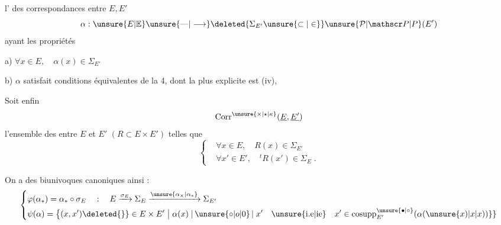 l' des  correspondances entre $E,E'$
\[
 \alpha:\unsure{E|{\mathbb E}}\unsure{\mbox{---}|\longrightarrow}
 \deleted{\Sigma_{E'}\unsure{\subset|\in}}\unsure{\mathcal P|\mathscr P|P}(E')
\]
ayant les propriétés

a) $\forall x\in E,\quad\alpha(x)\in\Sigma_{E'}$

b) $\alpha$ satisfait  conditions équivalentes de la  4, dont la plus explicite est  (iv), 

Soit enfin
\[
 \operatorname{Corr}^{\unsure{\times|\star|\kappa}}(\underline E,\underline{E'})
\]
l'ensemble des  entre  $E$ et $E'$ $(R\subset E\times E')$ telles que
\[
 \left\{\begin{aligned}
 &\forall x\in E,\quad R(x)\in\Sigma_{E'}\\
 &\forall x'\in E',\quad {}^{t}R(x')\in\Sigma_E\;.
 \end{aligned}\right.
\]

On a  des  biunivoques canoniques
 ainsi :
\[
 \left\{\begin{aligned}
 &\varphi(\alpha_{*})=\alpha_{*}\circ\sigma_E
 \quad:\quad E\xrightarrow{\sigma_E}\Sigma_E\xrightarrow{\unsure{\alpha_{\times}|\alpha_{*}}}\Sigma_{E'}\\
 &\psi(\alpha)=\bigl\{(x,x')\deleted{\}}\in E\times E'\bigm|
 \alpha(x)\mathrel{|\,\unsure{\circ|o|0}\,|}x'\quad
 \text{\unsure{i.e|ie}}\quad x'\in\operatorname{cosupp}^{\unsure{\bullet|\circ}}_{E'}(\alpha(\unsure{x)|x|x))\}}
 \end{aligned}\right.
\]

